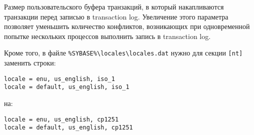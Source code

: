 Размер пользовательского буфера транзакций, в который накапливаются транзакции перед записью в transaction log. Увеличение этого параметра позволяет уменьшить количество конфликтов, возникающих при одновременной попытке нескольких процессов выполнить запись в transaction log.\par\bigskip

Кроме того, в файле \verb|%SYBASE%\locales\locales.dat| нужно для секции \verb|[nt]| заменить строки:
\begin{verbatim}
locale = enu, us_english, iso_1
locale = default, us_english, iso_1
\end{verbatim}
на:
\begin{verbatim}
locale = enu, us_english, cp1251
locale = default, us_english, cp1251
\end{verbatim}